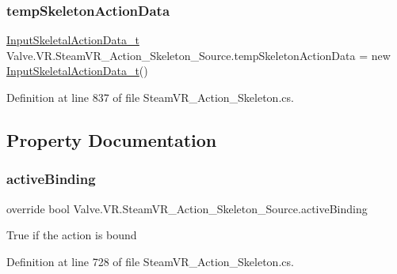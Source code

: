\subsubsection{\texorpdfstring{tempSkeletonActionData}{tempSkeletonActionData}}
{\footnotesize\ttfamily \mbox{\hyperlink{struct_valve_1_1_v_r_1_1_input_skeletal_action_data__t}{Input\+Skeletal\+Action\+Data\+\_\+t}} Valve.\+V\+R.\+Steam\+V\+R\+\_\+\+Action\+\_\+\+Skeleton\+\_\+\+Source.\+temp\+Skeleton\+Action\+Data = new \mbox{\hyperlink{struct_valve_1_1_v_r_1_1_input_skeletal_action_data__t}{Input\+Skeletal\+Action\+Data\+\_\+t}}()\hspace{0.3cm}{\ttfamily [protected]}}



Definition at line 837 of file Steam\+V\+R\+\_\+\+Action\+\_\+\+Skeleton.\+cs.



\subsection{Property Documentation}
\mbox{\label{class_valve_1_1_v_r_1_1_steam_v_r___action___skeleton___source_a78116723d56c3e18adab89cb768b21fb}} 
\subsubsection{\texorpdfstring{activeBinding}{activeBinding}}
{\footnotesize\ttfamily override bool Valve.\+V\+R.\+Steam\+V\+R\+\_\+\+Action\+\_\+\+Skeleton\+\_\+\+Source.\+active\+Binding\hspace{0.3cm}{\ttfamily [get]}}



True if the action is bound 



Definition at line 728 of file Steam\+V\+R\+\_\+\+Action\+\_\+\+Skeleton.\+cs.

\mbox{\label{class_valve_1_1_v_r_1_1_steam_v_r___action___skeleton___source_aaf248e7b316e530e1b742204f9de4296}} 
